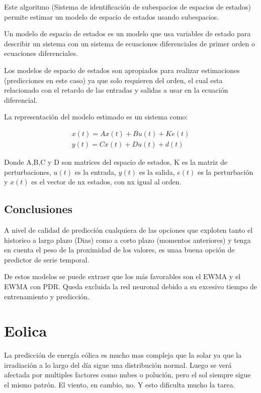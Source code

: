 Este algoritmo (Sistema de identificación de subespacios de espacios de estados) permite estimar un modelo de espacio de estados usando subespacios.

Un modelo de espacio de estados es un modelo que usa variables de estado para describir un sistema con un sistema de ecuaciones diferenciales de primer orden o ecuaciones diferenciales. 

Los modelos de espacio de estados son apropiados para realizar estimaciones (predicciones en este caso) ya que solo requieren del orden, el cual esta relacionado con el retardo de las entradas y salidas a usar en la ecuación diferencial.

La representación del modelo estimado es un sistema como:

\begin{align}
	x(t) = Ax(t) + Bu(t) + Ke(t) \\
	y(t) = Cx(t) + Du(t) + d(t)
\end{align}

Donde A,B,C y D son matrices del espacio de estados, K es la matriz de perturbaciones, $u(t)$ es la entrada, $y(t)$ es la salida, $e(t)$ es la perturbación y $x(t)$ es el vector de nx estados, con nx igual al orden.



\subsection{Conclusiones} 
\label{sub:conclusiones}

A nivel de calidad de predicción cualquiera de las opciones que exploten tanto el historico a largo plazo (Dias) como a corto plazo (momentos anteriores) y tenga en cuenta el peso de la proximidad de los valores, es unaa buena opción de predictor de serie temporal.

De estos modelos se puede extraer que los más favorables son el EWMA y el EWMA con PDR. Queda excluida la red neuronal debido a su excesivo tiempo de entrenamiento y predicción. 




\section{Eolica} 
\label{sec:eolica}

La predicción de energía eólica es mucho mas compleja que la solar ya que la irradiación a lo largo del día sigue una distribución normal. Luego se verá afectada por multiples factores como nubes o polución, pero el sol siempre sigue el mismo patrón. El viento, en cambio, no. Y esto dificulta mucho la tarea.

